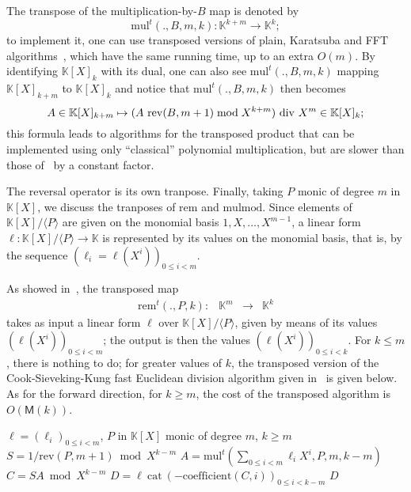 \documentclass[12pt]{article}
\def\M {\ensuremath{\mathsf{M}}}
\def\K {\ensuremath{\mathbb{K}}}
\def\mul {\ensuremath{\mathrm{mul}}}
\def\rem {\ensuremath{\mathrm{rem}}}
\def\cat {\ensuremath{\mathrm{cat}}}
\def\coeff {\ensuremath{\mathrm{coefficient}}}
\def\mulmod {\ensuremath{\mathrm{mulmod}}}
\def\rev {\ensuremath{\mathrm{rev}}}
\begin{document}
The transpose of the multiplication-by-$B$ map is denoted by
$$\mul^t(.,B,m,k): \K^{k+m} \to \K^k;$$ to implement it, one can use
transposed versions of plain, Karatsuba and
FFT algorithms~\cite{bostan+lecerf+schost:tellegen,hanrot+quercia+zimmermann},
which have the same running time, up to an extra $O(m)$.
By identifying $\K[X]_k$ with its dual, one can also see
$\mul^t(.,B,m,k)$ mapping $\K[X]_{k+m}$ to $\K[X]_{k}$ and notice that
$\mul^t(.,B,m,k)$ then becomes $$A \in \K[X]_{k+m} \mapsto
(A\ \rev(B,m+1) \bmod X^{k+m}){\rm~div~}X^{m} \in \K[X]_k;$$ this
formula leads to algorithms for the transposed product that can be
implemented using only ``classical'' polynomial multiplication, but
are slower than those
of~\cite{bostan+lecerf+schost:tellegen,hanrot+quercia+zimmermann} by a
constant factor. 

The reversal operator is its own tranpose. Finally, taking $P$ monic
of degree $m$ in $\K[X]$, we discuss the tranposes of $\rem$ and
$\mulmod$. Since elements of $\K[X]/\langle P \rangle$ are given on
the monomial basis $1,X,\dots,X^{m-1}$, a linear form $\ell:
\K[X]/\langle P \rangle \to \K$ is represented by its values on the
monomial basis, that is, by the sequence $(\ell_i=\ell(X^i))_{0 \le i
  < m}$.

As showed in~\cite{bostan+lecerf+schost:tellegen}, the transposed map
$$
\begin{array}{cccc}
\rem^t(.,P,k): &\K^m& \to &\K^k
\end{array}$$ 
takes as input a linear form $\ell$ over $\K[X]/\langle P \rangle$,
given by means of its values $(\ell(X^i))_{0 \le i < m}$; the output
is then the values $(\ell(X^i))_{0 \le i < k}$. For $k \le m$, there
is nothing to do; for greater values of $k$, the transposed version of
the Cook-Sieveking-Kung fast Euclidean division algorithm given
in~\cite{bostan+lecerf+schost:tellegen} is given below. As for the
forward direction, for $k \ge m$, the cost of the transposed algorithm
is $O(\M(k))$.

\begin{algorithm}[H]
  \caption{$\rem^t(\ell,P,k)$}
  \begin{algorithmic}[1]
    \REQUIRE $\ell=(\ell_i)_{0 \le i < m}$, $P$ in $\K[X]$ monic of degree $m$, $k \ge m$
    \STATE $S = 1/\rev(P, m+1) \bmod X^{k-m}$
    \STATE $A = \mul^t( \sum_{0 \le i < m} \ell_{i}X^i, P, m, k-m)$
    \STATE $C = S A \bmod X^{k-m}$
    \STATE $D = \ell ~\cat~ (-\coeff(C,i))_{0 \le i < k-m}$
    \RETURN $D$
  \end{algorithmic}
\end{algorithm}
\end{document}
